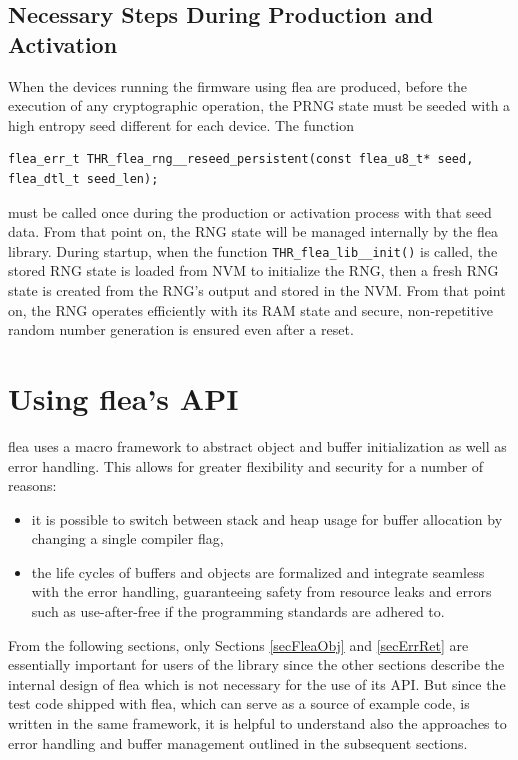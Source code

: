 \documentclass[a4paper,11pt]{scrartcl}
\begin{document}
\subsection{Necessary Steps During Production and Activation}
When the devices running the firmware using flea are produced, before the
execution of any cryptographic operation, the PRNG state must be seeded with a
high entropy seed different for each device. 
The function 
\begin{verbatim}
flea_err_t THR_flea_rng__reseed_persistent(const flea_u8_t* seed, flea_dtl_t seed_len);
\end{verbatim}
must be called once during the production or activation process with that seed data.
From that point on, the RNG state will be managed internally by the flea
library. During startup, when the function \verb#THR_flea_lib__init()# is
called, the stored RNG state is loaded from NVM to initialize the RNG, then a
fresh RNG state is created from the RNG's output and stored in the NVM. From
that point on, the RNG operates efficiently with its RAM state and secure,
non-repetitive random number generation is ensured even after a reset. 

\section{Using flea's API}

flea uses a macro framework to abstract object and buffer initialization as well
as error handling. This allows for greater flexibility and security for a number of reasons:
\begin{itemize}
  \item it is possible to switch between stack and heap usage for buffer allocation
  by changing a single compiler flag,
  \item the life cycles of buffers and objects are formalized and integrate
    seamless with the error handling, guaranteeing safety from resource leaks
    and errors such as use-after-free if the programming standards are adhered
    to.
\end{itemize}

From the following sections, only Sections \ref{secFleaObj} and \ref{secErrRet}
are essentially
important for users of the library since the other sections describe the
internal design of flea which is not necessary for the use of its API. But since
the test code shipped with flea, which can serve as a source of example code, is
written in the same framework, it is helpful to understand also the approaches
to error handling and buffer management outlined in the subsequent sections.
\end{document}
